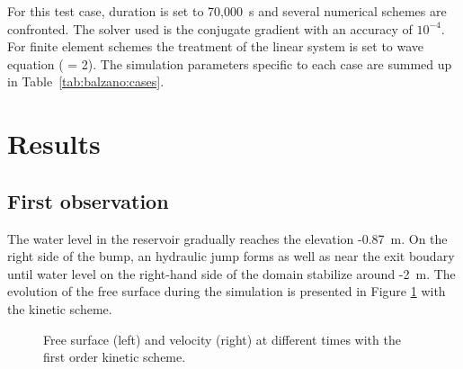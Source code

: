 For this test case, duration is set to 70,000~s and several numerical schemes
are confronted. The solver used is the conjugate gradient with an accuracy of $10^{-4}$.
For finite element schemes the treatment of the linear system is set to wave equation
( = 2).
The simulation parameters specific to each case are summed up in Table~\ref{tab:balzano:cases}.
\begin{table}[H]
  \caption{List of the simulation parameters used for the five cases.}
  \label{tab:balzano:cases}
\end{table}

%
\section{Results}

\subsection{First observation}
\label{subsection:balzano:observations}

The water level in the reservoir gradually reaches the elevation -0.87~m. On the right side of the bump,
an hydraulic jump forms as well as near the exit boudary until water level on the right-hand side of the domain
stabilize around -2~m. The evolution of the free surface during the simulation is presented in Figure
\ref{fig:balzano:firstobs} with the kinetic scheme.

\begin{figure}[H]
\begin{minipage}[t]{0.5\textwidth}
 \centering
\end{minipage}%
\begin{minipage}[t]{0.5\textwidth}
 \centering
\end{minipage}
\caption{Free surface (left) and velocity (right) at different times with the first order kinetic scheme.}
  \label{fig:balzano:firstobs}
\end{figure}

